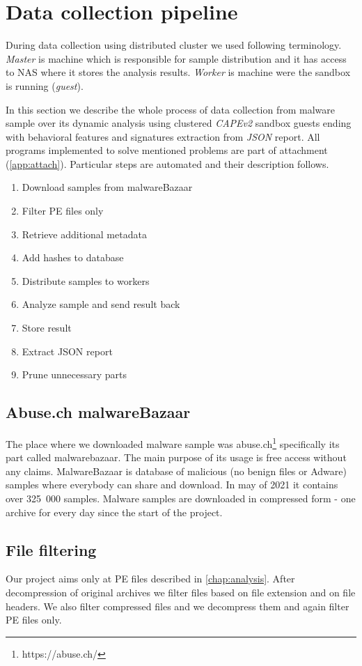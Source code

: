 \section{Data collection pipeline}
During data collection using distributed cluster we used following terminology. \emph{Master} is machine which is responsible for sample distribution and it has access to NAS where it stores the analysis results. \emph{Worker} is machine were the sandbox is running (\emph{guest}).

In this section we describe the whole process of data collection from malware sample over its dynamic analysis using clustered \emph{CAPEv2} sandbox guests ending with behavioral features and signatures extraction from \emph{JSON} report. All programs implemented to solve mentioned problems are part of attachment (\ref{app:attach}). Particular steps are automated and their description follows.

\begin{enumerate}
    \item Download samples from malwareBazaar
    \item Filter PE files only
    \item Retrieve additional metadata
    \item Add hashes to database
    \item Distribute samples to workers
    \item Analyze sample and send result back
    \item Store result
    \item Extract JSON report
    \item Prune unnecessary parts
\end{enumerate}


\subsection{Abuse.ch malwareBazaar}
The place where we downloaded malware sample was abuse.ch\footnote{https://abuse.ch/} specifically its part called malwarebazaar. The main purpose of its usage is free access without any claims. MalwareBazaar is database of malicious (no benign files or Adware) samples where everybody can share and download. In may of 2021 it contains over 325~000 samples. Malware samples are downloaded in compressed form - one archive for every day since the start of the project.

\subsection{File filtering}
Our project aims only at PE files described in \ref{chap:analysis}. After decompression of original archives we filter files based on file extension and on file headers. We also filter compressed files and we decompress them and again filter PE files only.


